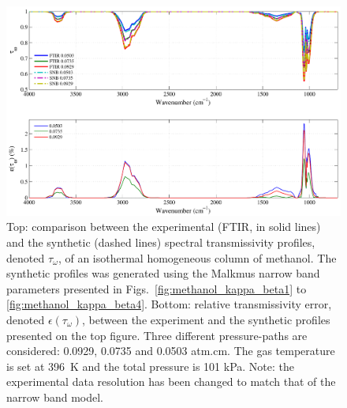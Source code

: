 \begin{figure}[p]
\includegraphics[width=\textwidth]{Figures/Comparison_Fit_Methanol_MALKMUS_Temp396K.pdf}
\caption{Top: comparison between the experimental (FTIR, in solid lines) and the synthetic (dashed lines) spectral transmissivity profiles, denoted $\tau_{\omega}$, of an isothermal homogeneous column of methanol. The synthetic profiles was generated using the Malkmus narrow band parameters presented in Figs.~\ref{fig:methanol_kappa_beta1} to \ref{fig:methanol_kappa_beta4}. Bottom: relative transmissivity error, denoted $\epsilon{(\tau_{\omega})}$, between the experiment and the synthetic profiles presented on the top figure. Three different pressure-paths are considered: 0.0929, 0.0735 and 0.0503 atm.cm. The gas temperature is set at 396~K and the total pressure is 101 kPa. Note: the experimental data resolution has been changed to match that of the narrow band model. \label{fig:methanol_SNBVerify_396K}}
\end{figure}

